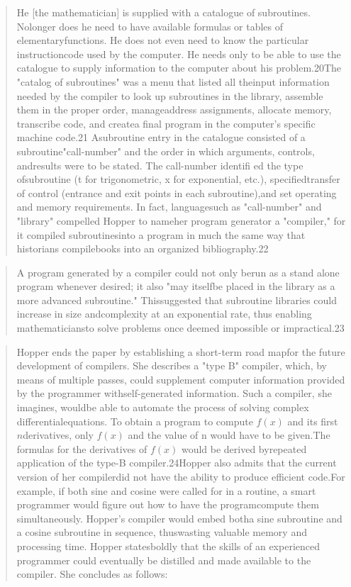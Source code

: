 \begin{quotation}
	He [the mathematician] is supplied with a catalogue of subroutines. Nolonger
	does he need to have available formulas or tables of elementaryfunctions. He
	does not even need to know the particular instructioncode used by the computer.
	He needs only to be able to use the catalogue to supply information to the
	computer about his problem.20The "catalog of subroutines" was a menu that
	listed all theinput information needed by the compiler to look up subroutines
	in the library, assemble them in the proper order, manageaddress assignments,
	allocate memory, transcribe code, and createa final program in the computer's
	specific machine code.21 Asubroutine entry in the catalogue consisted of a
	subroutine"call-number" and the order in which arguments, controls, andresults
	were to be stated. The call-number identifi ed the type ofsubroutine (t for
	trigonometric, x for exponential, etc.), specifiedtransfer of control (entrance
	and exit points in each subroutine),and set operating and memory requirements.
	In fact, languagesuch as "call-number" and "library" compelled Hopper to
	nameher program generator a "compiler," for it compiled subroutinesinto a
	program in much the same way that historians compilebooks into an organized
	bibliography.22
\end{quotation}
\begin{quotation}
	A program generated by a compiler could not only berun as a stand alone program
	whenever desired; it also "may itselfbe placed in the library as a more
	advanced subroutine." Thissuggested that subroutine libraries could increase in
	size andcomplexity at an exponential rate, thus enabling mathematiciansto solve
	problems once deemed impossible or impractical.23
\end{quotation}
\begin{quotation}
	Hopper ends the paper by establishing a short-term road mapfor the future
	development of compilers. She describes a "type B" compiler, which, by means of
	multiple passes, could supplement computer information provided by the
	programmer withself-generated information. Such a compiler, she imagines,
	wouldbe able to automate the process of solving complex differentialequations.
	To obtain a program to compute $f(x)$ and its first $n$derivatives, only $f(x)$
	and the value of n would have to be given.The formulas for the derivatives of
	$f(x)$ would be derived byrepeated application of the type-B compiler.24Hopper
	also admits that the current version of her compilerdid not have the ability to
	produce efficient code.For example, if both sine and cosine were called for in
	a routine,
	a smart programmer would figure out how to have the programcompute them
	simultaneously. Hopper's compiler would embed botha sine subroutine and a
	cosine subroutine in sequence, thuswasting valuable memory and processing time.
	Hopper statesboldly that the skills of an experienced programmer could
	eventually be distilled and made available to the compiler. She concludes as
	follows:
\end{quotation}
